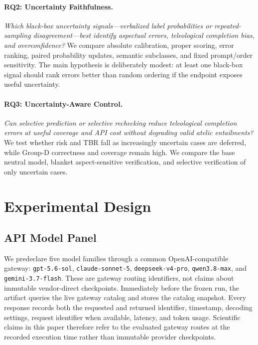 \documentclass[letterpaper]{article}
\begin{document}
\paragraph{RQ2: Uncertainty Faithfulness.} \emph{Which black-box uncertainty signals---verbalized label probabilities or repeated-sampling disagreement---best identify aspectual errors, teleological completion bias, and overconfidence?} We compare absolute calibration, proper scoring, error ranking, paired probability updates, semantic subclasses, and fixed prompt/order sensitivity. The main hypothesis is deliberately modest: at least one black-box signal should rank errors better than random ordering if the endpoint exposes useful uncertainty.

\paragraph{RQ3: Uncertainty-Aware Control.} \emph{Can selective prediction or selective rechecking reduce teleological completion errors at useful coverage and API cost without degrading valid atelic entailments?} We test whether risk and TBR fall as increasingly uncertain cases are deferred, while Group-D correctness and coverage remain high. We compare the base neutral model, blanket aspect-sensitive verification, and selective verification of only uncertain cases.

\section{Experimental Design}
\subsection{API Model Panel}
We predeclare five model families through a common OpenAI-compatible gateway: \texttt{gpt-5.6-sol}, \texttt{claude-sonnet-5}, \texttt{deepseek-v4-pro}, \texttt{qwen3.8-max}, and \texttt{gemini-3.7-flash}. These are gateway routing identifiers, not claims about immutable vendor-direct checkpoints. Immediately before the frozen run, the artifact queries the live gateway catalog and stores the catalog snapshot. Every response records both the requested and returned identifier, timestamp, decoding settings, request identifier when available, latency, and token usage. Scientific claims in this paper therefore refer to the evaluated gateway routes at the recorded execution time rather than immutable provider checkpoints.

\begin{table}[t]
\centering
\small

\end{table}
\end{document}
